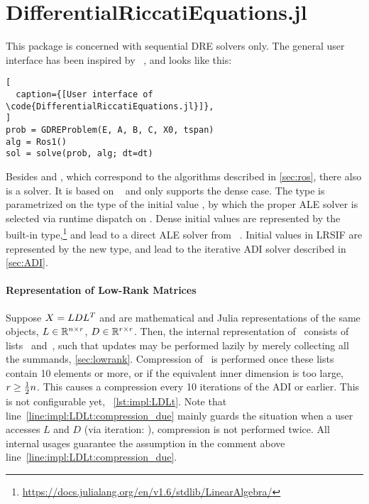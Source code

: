 \section{DifferentialRiccatiEquations.jl}
\label{sec:impl:DRE}

%

This package is concerned with sequential \ac{DRE} solvers only.
The general user interface has been inspired by ~\cite{DifferentialEquations},
and looks like this:
\begin{lstlisting}[
  caption={[User interface of \code{DifferentialRiccatiEquations.jl}]},
]
prob = GDREProblem(E, A, B, C, X0, tspan)
alg = Ros1()
sol = solve(prob, alg; dt=dt)
\end{lstlisting}
Besides  and ,
which correspond to the algorithms described in \autoref{sec:ros},
there also is a  solver.
It is based on \citeauthor{Lang2017}~\cite[Appendix~A]{Lang2017} and only supports the dense case.
The  type is parametrized on the type of the initial value ,
by which the proper \ac{ALE} solver is selected via runtime dispatch on .
Dense initial values are represented by the built-in  type,\footnote{%
  \url{https://docs.julialang.org/en/v1.6/stdlib/LinearAlgebra/}}
and lead to a direct \ac{ALE} solver from ~\cite{MatrixEquations}.
Initial values in \ac{LRSIF} are represented by the new \julia{\LDLt} type,
and lead to the iterative \ac{ADI} solver described in \autoref{sec:ADI}.

\paragraph{Representation of Low-Rank Matrices}

Suppose $X = LDL^T$ and  are mathematical and Julia representations of the same objects,
$L\in\mathbb{R}^{n\times r}$, $D\in\mathbb{R}^{r\times r}$.
Then, the internal representation of~ consists of lists~\julia{[L]} and~\julia{[D]},
such that updates may be performed lazily by merely collecting all the summands,
\cf \autoref{sec:lowrank}.
Compression of~ is performed once these lists contain 10 elements or more,
or if the equivalent inner dimension is too large, $r \geq \tfrac{1}{2} n$.
This causes a compression every 10 iterations of the \ac{ADI} or earlier.
This is not configurable yet,
\cf~\autoref{lst:impl:LDLt}.
Note that line~\ref{line:impl:LDLt:compression_due} mainly guards the situation
when a user accesses $L$ and $D$ (via iteration: \mbox{}),
compression is not performed twice.
All internal usages guarantee the assumption in the comment above line~\ref{line:impl:LDLt:compression_due}.

